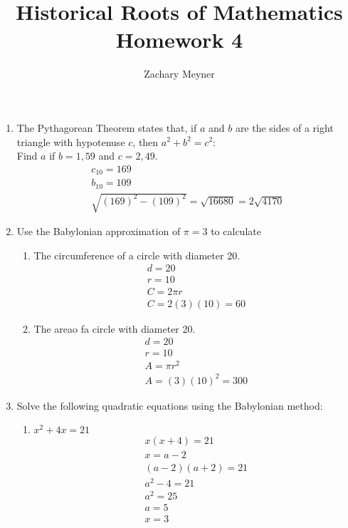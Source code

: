 \documentclass[12pt]{article}
\title{\large Historical Roots of Mathematics Homework 4}
\author{\large Zachary Meyner}
\date{}
\begin{document}
\maketitle
\begin{enumerate}
    \item The Pythagorean Theorem states that, if $a$ and $b$ are the sides of a right triangle with 
    hypotenuse $c$, then $a^2+b^2=c^2$: \\
    Find $a$ if $b=1,59$ and $c=2,49$. 
    \begin{gather*}
        c_{10}=169 \\
        b_{10}=109 \\
        \sqrt{{(169)}^2-{(109)}^2}=\sqrt{16680}=2\sqrt{4170}
    \end{gather*}
    \item Use the Babylonian approximation of $\pi=3$ to calculate
    \begin{enumerate}
        \item The circumference of a circle with diameter 20.
        \begin{gather*}
            d=20 \\
            r=10 \\
            C=2\pi r \\
            C=2(3)(10)=60
        \end{gather*}
        \item The areao fa circle with diameter 20.
        \begin{gather*}
            d=20 \\
            r=10 \\
            A=\pi r^2 \\
            A=(3){(10)}^2=300
        \end{gather*}
    \end{enumerate}
    \item Solve the following quadratic equations using the Babylonian method:
    \begin{enumerate}
        \item $x^2+4x=21$
        \begin{gather*}
            x(x+4)=21 \\
            x=a-2 \\
            (a-2)(a+2)=21 \\
            a^2-4=21 \\
            a^2=25 \\
            a=5 \\
            x=3

\end{gather*}
\end{enumerate}
\end{enumerate}
\end{document}

